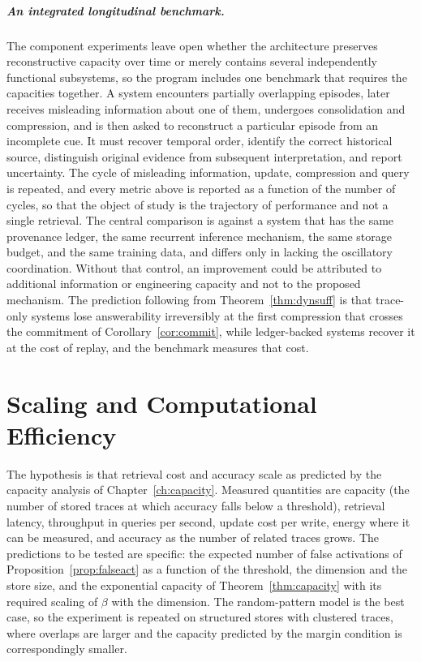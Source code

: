 \paragraph{An integrated longitudinal benchmark.} The component experiments leave open whether the architecture preserves reconstructive capacity over time or merely contains several independently functional subsystems, so the program includes one benchmark that requires the capacities together. A system encounters partially overlapping episodes, later receives misleading information about one of them, undergoes consolidation and compression, and is then asked to reconstruct a particular episode from an incomplete cue. It must recover temporal order, identify the correct historical source, distinguish original evidence from subsequent interpretation, and report uncertainty. The cycle of misleading information, update, compression and query is repeated, and every metric above is reported as a function of the number of cycles, so that the object of study is the trajectory of performance and not a single retrieval. The central comparison is against a system that has the same provenance ledger, the same recurrent inference mechanism, the same storage budget, and the same training data, and differs only in lacking the oscillatory coordination. Without that control, an improvement could be attributed to additional information or engineering capacity and not to the proposed mechanism. The prediction following from Theorem~\ref{thm:dynsuff} is that trace-only systems lose answerability irreversibly at the first compression that crosses the commitment of Corollary~\ref{cor:commit}, while ledger-backed systems recover it at the cost of replay, and the benchmark measures that cost.

\chapter{Scaling and Computational Efficiency}\label{ch:scaling}

The hypothesis is that retrieval cost and accuracy scale as predicted by the capacity analysis of Chapter~\ref{ch:capacity}. Measured quantities are capacity (the number of stored traces at which accuracy falls below a threshold), retrieval latency, throughput in queries per second, update cost per write, energy where it can be measured, and accuracy as the number of related traces grows. The predictions to be tested are specific: the expected number of false activations of Proposition~\ref{prop:falseact} as a function of the threshold, the dimension and the store size, and the exponential capacity of Theorem~\ref{thm:capacity} with its required scaling of $\beta$ with the dimension. The random-pattern model is the best case, so the experiment is repeated on structured stores with clustered traces, where overlaps are larger and the capacity predicted by the margin condition is correspondingly smaller.

